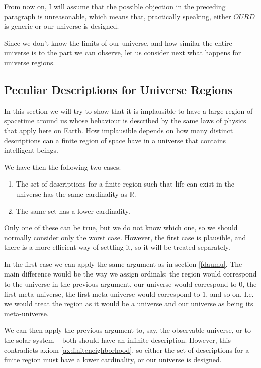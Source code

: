 \documentclass[a4paper
,draft
]{article}
\def\reale{\mathbb{R}}
\def\our_description{OURD}
\begin{document}
From now on, I will assume that the possible objection in the preceding
paragraph is unreasonable, which means that, practically speaking,
either $\our_description$ is generic or our universe is designed.

Since we don't know the limits of our universe, and how similar
the entire universe is to the part we can observe, let us consider next
what happens for universe regions.

\subsection{Peculiar Descriptions for Universe Regions}
\label{sec:peculiarregions}

In this section we will try to show that it is implausible to have a large
region of spacetime around us whose behaviour is described by the same laws
of physics that apply here on Earth.
How implausible depends on how many
distinct descriptions can a finite region of space have in a universe
that contains intelligent beings.

We have then the following two cases:
\begin{enumerate}
  \item The set of descriptions for a finite region such that life
      can exist in the universe has the same cardinality as $\reale$.
  \item The same set has a lower cardinality.
\end{enumerate}
Only one of these can be true, but we do not know which one, so we should
normally consider only the worst case. However, the first case is plausible,
and there is a more efficient way of settling it, so it will be treated
separately.

In the first case we can apply the same argument
as in section \ref{fdaumu}. The main difference would be the way we assign
ordinals: the region would correspond to the universe in the previous argument,
our universe would correspond to $0$, the first meta-universe,
the first meta-universe would correspond
to $1$, and so on. I.e. we would treat the region as it would be a universe
and our universe as being its meta-universe.

We can then apply the previous argument to, say, the observable universe, or
to the solar system -- both should have an infinite description.
However, this contradicts axiom \ref{ax:finiteneighborhood}, so either the
set of descriptions for a finite region must have a lower cardinality, or our
universe is designed.
\end{document}
